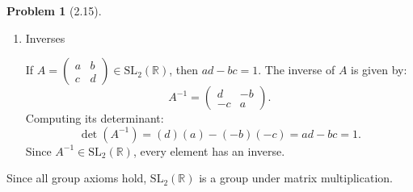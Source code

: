 \documentclass[12pt]{article}
\theoremstyle{definition}
\newtheorem{problem}{Problem}
\begin{document}
\begin{problem}[2.15]
\begin{enumerate}[label=(\alph*)]
\begin{solution}
\begin{enumerate}[label=(\roman*)]
                \item Inverses
                
                If $A = \begin{pmatrix} a & b \\ c & d \end{pmatrix} \in \text{SL}_2(\mathbb{R})$, then $ad - bc = 1$. The inverse of $A$ is given by:
                \[
                A^{-1} = \begin{pmatrix} d & -b \\ -c & a \end{pmatrix}.
                \]
                Computing its determinant:
                \[
                \det(A^{-1}) = (d)(a) - (-b)(-c) = ad - bc = 1.
                \]
                Since $A^{-1} \in \text{SL}_2(\mathbb{R})$, every element has an inverse.
            \end{enumerate}
        Since all group axioms hold, $\text{SL}_2(\mathbb{R})$ is a group under matrix multiplication.
        \end{solution}
    \end{enumerate}
\end{problem}
\end{document}
